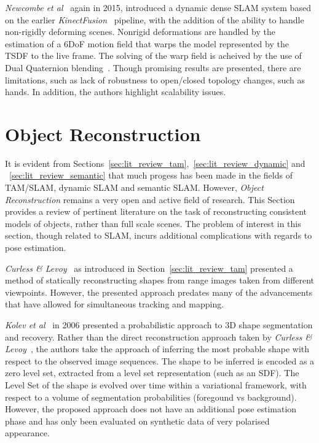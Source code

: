 \textit{Newcombe et al}~\cite{Newcombe2015} again in 2015, introduced a dynamic dense SLAM 
system based on the earlier \textit{KinectFusion}~\cite{Newcombe2015} pipeline, with the addition 
of the ability to handle non-rigidly deforming scenes. Nonrigid deformations are handled by the 
estimation of a 6DoF motion field that warps the model represented by the TSDF to the live frame. The 
solving of the warp field is acheived by the use of Dual Quaternion blending~\cite{Kavan2006}. 
Though promising results are presented, there are limitations, such as lack of robustness to 
open/closed topology changes, such as hands. In addition, the authors highlight scalability issues.

\section{Object Reconstruction}
\label{sec:lit_review_obj_recon}
It is evident from Sections~\ref{sec:lit_review_tam},~\ref{sec:lit_review_dynamic} and 
~\ref{sec:lit_review_semantic} that much progess has been made in the fields of TAM/SLAM, 
dynamic SLAM and semantic SLAM. However, \textit{Object Reconstruction} remains a very open 
and active field of research. This Section provides a review of pertinent literature on the 
task of reconstructing consistent models of objects, rather than full scale scenes. The problem of 
interest in this section, though related to SLAM, incurs additional complications with regards 
to pose estimation.

\textit{Curless \& Levoy}~\cite{Curless1996} as introduced in Section~\ref{sec:lit_review_tam} 
presented a method of statically reconstructing shapes from range images taken from different 
viewpoints. However, the presented approach predates many of the advancements that have allowed 
for simultaneous tracking and mapping.

\textit{Kolev et al}~\cite{Kolev2006} in 2006 presented a probabilistic approach to 3D shape 
segmentation and recovery. Rather than the direct reconstruction approach taken by 
\textit{Curless \& Levoy}~\cite{Curless1996}, the authors take the approach of inferring the most 
probable shape with respect to the observed image sequences. The shape to be inferred is encoded as a 
zero level set, extracted from a level set representation (such as an SDF). The Level Set of the shape is 
evolved over time within a variational framework, with respect to a volume of segmentation 
probabilities (foregound vs background). However, the proposed approach does not have an additional pose 
estimation phase and has only been evaluated on synthetic data of very polarised appearance.

